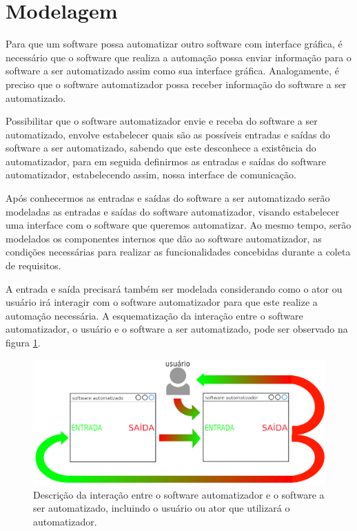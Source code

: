 \documentclass[tg]{mdtufsm}
\begin{document}
        \section{Modelagem}

            Para que um software possa automatizar outro software com interface gráfica, é necessário que o software que realiza a automação possa enviar informação para o software a ser automatizado assim como sua interface gráfica. Analogamente, é preciso que o software automatizador possa receber informação do software a ser automatizado.

            Possibilitar que o software automatizador envie e receba do software a ser automatizado,  envolve estabelecer quais são as possíveis entradas e saídas do software a ser automatizado, sabendo que este desconhece a existência do automatizador, para em seguida definirmos as entradas e saídas do software automatizador, estabelecendo assim, nossa interface de comunicação.

            Após conhecermos as entradas e saídas do software a ser automatizado serão modeladas as entradas e saídas do software automatizador, visando estabelecer uma interface com o software que queremos automatizar. Ao mesmo tempo, serão modelados os componentes internos que dão ao software automatizador, as condições necessárias para realizar as funcionalidades concebidas durante a coleta de requisitos.

            A entrada e saída precisará também ser modelada considerando como o ator ou usuário irá interagir com o software automatizador para que este realize a automação necessária. A esquematização da interação entre o software automatizador, o usuário e o software a ser automatizado, pode ser observado na figura \ref{fig:generalIO}.

            \begin{figure}[!htb]
                {\centering
                \includegraphics[width=1.0\textwidth]{imagens/generalIO}
                \caption{Descrição da interação entre o software automatizador e o software a ser automatizado, incluindo o usuário ou ator que utilizará o automatizador.}
                \label{fig:generalIO}}
            \end{figure}
\end{document}
